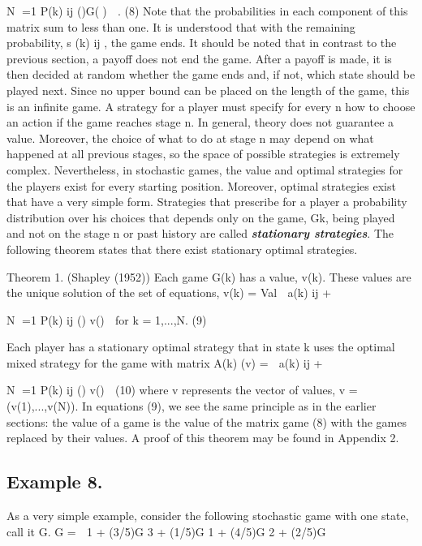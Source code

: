 \documentclass[]{report}
\begin{document}
N
=1
P(k)
ij ()G()

. (8)
Note that the probabilities in each component of this matrix sum to less than one. It is
understood that with the remaining probability, s
(k)
ij , the game ends. It should be noted
that in contrast to the previous section, a payoff does not end the game. After a payoff is
made, it is then decided at random whether the game ends and, if not, which state should
be played next.
Since no upper bound can be placed on the length of the game, this is an infinite
game. A strategy for a player must specify for every n how to choose an action if the game
reaches stage n. In general, theory does not guarantee a value. Moreover, the choice of
what to do at stage n may depend on what happened at all previous stages, so the space
of possible strategies is extremely complex.
Nevertheless, in stochastic games, the value and optimal strategies for the players
exist for every starting position. Moreover, optimal strategies exist that have a very simple
form. Strategies that prescribe for a player a probability distribution over his choices that
depends only on the game, Gk, being played and not on the stage n or past history are
called \textbf{\textit{stationary strategies}}. The following theorem states that there exist stationary
optimal strategies.
\begin{framed}
Theorem 1. (Shapley (1952)) Each game G(k) has a value, v(k). These values are the
unique solution of the set of equations,
v(k) = Val 
a(k)
ij +

N
=1
P(k)
ij () v()

for k = 1,...,N. (9)
\end{framed}
Each player has a stationary optimal strategy that in state k uses the optimal mixed
strategy for the game with matrix
A(k)
(v) = 
a(k)
ij +

N
=1
P(k)
ij () v()

(10)
where v represents the vector of values, v = (v(1),...,v(N)).
In equations (9), we see the same principle as in the earlier sections: the value of a
game is the value of the matrix game (8) with the games replaced by their values. A proof
of this theorem may be found in Appendix 2.
\subsection{Example 8.} As a very simple example, consider the following stochastic game with
one state, call it G.
G =
 1 + (3/5)G 3 + (1/5)G
1 + (4/5)G 2 + (2/5)G
\end{document}
